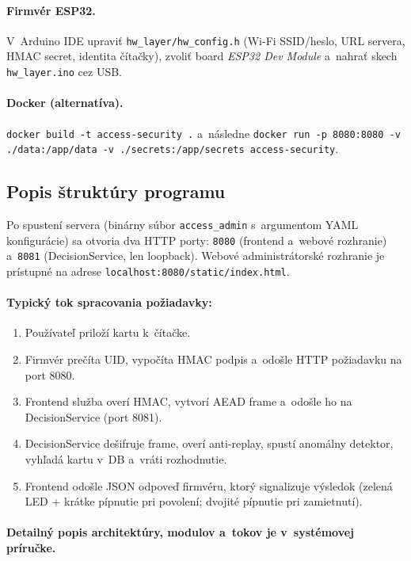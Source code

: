 \documentclass[a4paper]{feidippp}
\begin{document}
\paragraph{Firmvér ESP32.} V~Arduino IDE upraviť \texttt{hw\_layer/hw\_config.h} (Wi-Fi SSID/heslo, URL servera, HMAC secret, identita čítačky), zvoliť board \emph{ESP32 Dev Module} a~nahrať skech \texttt{hw\_layer.ino} cez USB.

\paragraph{Docker (alternatíva).} \texttt{docker build -t access-security .} a~následne \texttt{docker run -p 8080:8080 -v ./data:/app/data -v ./secrets:/app/secrets access-security}.

\subsection{Popis štruktúry programu}

Po spustení servera (binárny súbor \texttt{access\_admin} s~argumentom YAML konfigurácie) sa otvoria dva HTTP porty: \texttt{8080} (frontend a~webové rozhranie) a~\texttt{8081} (DecisionService, len loopback). Webové administrátorské rozhranie je prístupné na adrese \texttt{localhost:8080/static/}\allowbreak\texttt{index.html}.

\paragraph{Typický tok spracovania požiadavky:}
\begin{enumerate}
\item Používateľ priloží kartu k~čítačke.
\item Firmvér prečíta UID, vypočíta HMAC podpis a~odošle HTTP požiadavku na port 8080.
\item Frontend služba overí HMAC, vytvorí AEAD frame a~odošle ho na DecisionService (port 8081).
\item DecisionService dešifruje frame, overí anti-replay, spustí anomálny detektor, vyhľadá kartu v~DB a~vráti rozhodnutie.
\item Frontend odošle JSON odpoveď firmvéru, ktorý signalizuje výsledok (zelená LED + krátke pípnutie pri povolení; dvojité pípnutie pri zamietnutí).
\end{enumerate}

\paragraph{Detailný popis architektúry, modulov a~tokov je v~systémovej príručke.}
\end{document}
